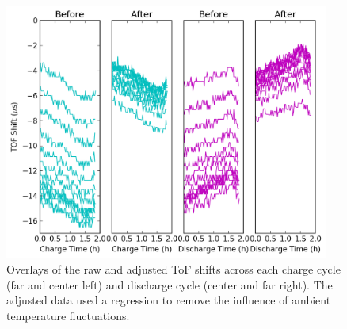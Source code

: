\begin{figure}[t]\label{fig:0417overlays}
\includegraphics[width=0.95\textwidth]{Thesis/0417overlays.png}
\centering
\caption{Overlays of the raw and adjusted ToF shifts across each charge cycle (far and center left) and discharge cycle (center and far right). The adjusted data used a regression to remove the influence of ambient temperature fluctuations.}
\end{figure}
